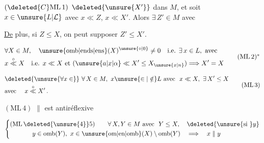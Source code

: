 $(\deleted{C}\mathrm{ML\,1})$  $\deleted{\unsure{X'}}$
dans $M$, et soit $x\in\unsure{L|\mathcal L}$ avec $x\ll Z$, $x\ll X'$. Alors $\exists\,Z'\in M$ avec

\uline{De} plus, si $Z\leq X$, on peut supposer $Z'\leq X'$.

\[
\begin{aligned}
 &\forall X\in M,\quad \unsure{\mathrm{omb}|\mathrm{ends}|\mathrm{ens}}(X)^{\unsure{\circ|0}}\ne 0
   \quad\text{i.e. }\exists\,x\in L,\ \text{avec}\\
 &x\mathrel{\overset{\circ}{\ll}}X\quad\text{i.e. }x\ll X\text{ et }
   (\unsure{a|x|\alpha}\ll X'\leq X_{\unsure{x|n}})\Longrightarrow X'=X
\end{aligned}
\tag*{$(\mathrm{ML\,2})^{*}$}
\]

\[
\begin{aligned}
 &\deleted{\unsure{\forall x\in}}\ \forall\,X\in M,\ x\unsure{\in|\notin}L
    \ \text{avec }\ x\ll X,\ \exists\,X'\leq X\\
 &\text{avec }\quad x\mathrel{\overset{\circ}{\ll}}X'\,.
\end{aligned}
\tag*{$(\mathrm{ML\,3})$}
\]

$(\mathrm{ML\,4})$ $\parallel$ est  antiréflexive 

\[
\left\{\begin{aligned}
 &(\mathrm{ML}\,\deleted{\unsure{4}}5)\qquad \forall\,X,Y\in M\ \text{avec }\ Y\leq X,\quad\deleted{\text{\unsure{si }}y}\\
 &\hspace{3.5em} y\in\mathrm{omb}(Y),\ x\in\unsure{\mathrm{om}|\mathrm{en}|\mathrm{omb}}(X)
    \setminus\mathrm{omb}(Y)\quad\Longrightarrow\quad x\parallel y
\end{aligned}\right.
\]
\endgroup

